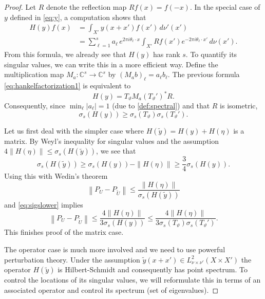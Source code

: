 \documentclass[11pt]{article}
\theoremstyle{definition}
\numberwithin{theorem}{section}
\numberwithin{lemma}{section}
\numberwithin{equation}{section}
\def\C{\mathbb{C}}
\renewcommand{\tilde}{\widetilde}
\newcommand{\bfa}{a}
\newcommand{\norm}[1]{{\left\|#1\right\|}}
\numberwithin{equation}{section}
\begin{document}
	\begin{proof}
		Let $R$ denote the reflection map $Rf(x)=f(-x)$. In the special case of $y$ defined in \eqref{eq:y}, a computation shows that
		\begin{equation}
			\begin{split}
				H(y)f(x)
				&=\int_{X'} y(x+x') f(x') \, d\nu'(x')  \\
				&= \sum_{\ell=1}^s a_\ell \, e^{2\pi i \theta_\ell \cdot x} \int_{X'} Rf(x')e^{-2\pi i \theta_\ell \cdot x'}  \, d\nu(x'). 
			\end{split} \label{eq:hankelfactorization1} 
		\end{equation}
		From this formula, we already see that $H(y)$ has rank $s$. To quantify its singular values, we can write this in a more efficient way. Define the multiplication map $M_{\bfa}\colon \C^s \to \C^s$ by $(M_{\bfa} b)_\ell=a_\ell b_\ell$. The previous formula \eqref{eq:hankelfactorization1}  is equivalent to	
		\begin{equation}
			\label{eq:hankelfactorization2}
			H(y)
			= T_{\vartheta} M_{\bfa} (T_{\vartheta}')^* R. 
		\end{equation}
		Consequently, since $\min_\ell |a_\ell|=1$ (due to \cref{def:spectral}) and that $R$ is isometric,
		\begin{equation}
			\sigma_s(H(y))
			\geq \sigma_s(T_{\vartheta}) \sigma_s(T_{\vartheta}').
			\label{eq:sigslower} 
		\end{equation}
		
		Let us first deal with the simpler case where $H(\tilde y)=H(y)+H(\eta)$ is a matrix. By Weyl's inequality for singular values and the assumption $4\|H(\eta)\|\leq \sigma_s(H(\tilde y))$, we see that
		$$
		\sigma_s(H(\tilde y))
		\geq \sigma_s(H(y)) - \|H(\eta)\|
		\geq \frac 34 \sigma_s(H(y)). 
		$$
		Using this with Wedin's theorem 
		\begin{equation}
	\label{eq:wedin}
	\norm{P_U-P_{\tilde U}}
	\leq \frac{\|H(\eta)\|}{\sigma_s(H(\tilde y))}
\end{equation}	
 and \eqref{eq:sigslower} implies 
		$$
		\norm{P_U-P_{\tilde U}}
		\leq \frac{4\|H(\eta)\|}{3\sigma_s(H(y))}
		\leq \frac{4\|H(\eta)\|}{3\sigma_s(T_{\vartheta}) \sigma_s(T_{\vartheta}')}.
		$$
		This finishes proof of the matrix case. 
		
		The operator case is much more involved and we need to use powerful perturbation theory. Under the assumption $\tilde y(x+x')\in L^2_{\nu\times \nu'}(X\times X')$ the operator $H(\tilde y)$ is Hilbert-Schmidt and consequently has point spectrum. To control the locations of its singular values, we will reformulate this in terms of an associated operator and control its spectrum (set of eigenvalues).
		

\end{proof}
\end{document}
